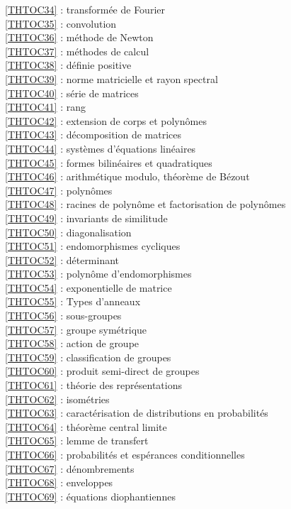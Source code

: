 \ref {THTOC34} : transformée de Fourier\\
\ref {THTOC35} : convolution\\
\ref {THTOC36} : méthode de Newton\\
\ref {THTOC37} : méthodes de calcul\\
\ref {THTOC38} : définie positive\\
\ref {THTOC39} : norme matricielle et rayon spectral\\
\ref {THTOC40} : série de matrices\\
\ref {THTOC41} : rang\\
\ref {THTOC42} : extension de corps et polynômes\\
\ref {THTOC43} : décomposition de matrices\\
\ref {THTOC44} : systèmes d'équations linéaires\\
\ref {THTOC45} : formes bilinéaires et quadratiques\\
\ref {THTOC46} : arithmétique modulo, théorème de Bézout\\
\ref {THTOC47} : polynômes\\
\ref {THTOC48} : racines de polynôme et factorisation de polynômes\\
\ref {THTOC49} : invariants de similitude\\
\ref {THTOC50} : diagonalisation\\
\ref {THTOC51} : endomorphismes cycliques\\
\ref {THTOC52} : déterminant\\
\ref {THTOC53} : polynôme d'endomorphismes\\
\ref {THTOC54} : exponentielle de matrice\\
\ref {THTOC55} : Types d'anneaux\\
\ref {THTOC56} : sous-groupes\\
\ref {THTOC57} : groupe symétrique\\
\ref {THTOC58} : action de groupe\\
\ref {THTOC59} : classification de groupes\\
\ref {THTOC60} : produit semi-direct de groupes\\
\ref {THTOC61} : théorie des représentations\\
\ref {THTOC62} : isométries\\
\ref {THTOC63} : caractérisation de distributions en probabilités\\
\ref {THTOC64} : théorème central limite\\
\ref {THTOC65} : lemme de transfert\\
\ref {THTOC66} : probabilités et espérances conditionnelles\\
\ref {THTOC67} : dénombrements\\
\ref {THTOC68} : enveloppes\\
\ref {THTOC69} : équations diophantiennes\\
